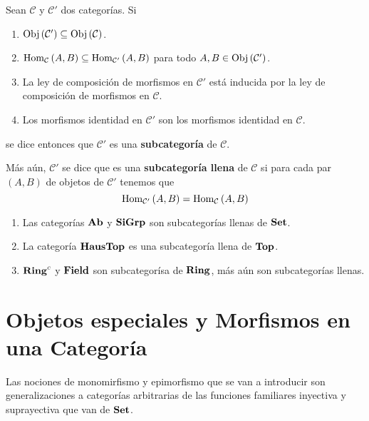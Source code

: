 \documentclass[12pt]{report}
\theoremstyle{largebreak}
\newcommand{\Obj}[1]{\ensuremath{\textup{Obj}\left(#1\right)}}
\newcommand{\Hom}[3]{\ensuremath{\textup{Hom}_{#1}\left(#2,#3\right)}}
\newcommand{\Cat}[1]{\ensuremath{\textup{\textbf{#1}}}}
\begin{document}
    \begin{mydef}
        Sean $\mathcal{C}$ y $\mathcal{C}'$ dos categorías. Si
        \begin{enumerate}
            \item $\Obj{\mathcal{C}'}\subseteq\Obj{\mathcal{C}}$.
            \item $\Hom{\mathcal{C}}{A}{B}\subseteq\Hom{\mathcal{C}'}{A}{B}$ para todo $A,B\in\Obj{\mathcal{C}'}$.
            \item La ley de composición de morfismos en $\mathcal{C}'$ está inducida por la ley de composición de morfismos en $\mathcal{C}$.
            \item Los morfismos identidad en $\mathcal{C}'$ son los morfismos identidad en $\mathcal{C}$.
        \end{enumerate}
        se dice entonces que $\mathcal{C}'$ es una \textbf{subcategoría} de $\mathcal{C}$.

        Más aún, $\mathcal{C}'$ se dice que es una \textbf{subcategoría llena} de $\mathcal{C}$ si para cada par $(A,B)$ de objetos de $\mathcal{C}'$ tenemos que
        \begin{equation*}
            \Hom{\mathcal{C}'}{A}{B}=\Hom{\mathcal{C}}{A}{B}
        \end{equation*}
    \end{mydef}

    \begin{exa}
        \begin{enumerate}
            Se cumple lo siguiente:
            \item Las categorías $\Cat{Ab}$ y $\Cat{SiGrp}$ son subcategorías llenas de $\Cat{Set}$.
            \item La categoría $\Cat{HausTop}$ es una subcategoría llena de $\Cat{Top}$.
            \item $\Cat{Ring}^c$ y $\Cat{Field}$ son subcategorísa de $\Cat{Ring}$, más aún son subcategorías llenas.
        \end{enumerate}
    \end{exa}

    \section{Objetos especiales y Morfismos en una Categoría}

    Las nociones de monomirfismo y epimorfismo que se van a introducir son generalizaciones a categorías arbitrarias de las funciones familiares inyectiva y suprayectiva que van de $\Cat{Set}$.
\end{document}
